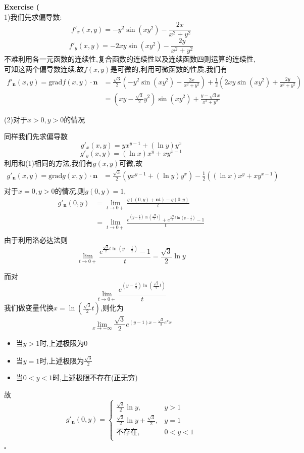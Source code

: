\documentclass{article}
\newenvironment{exercise}[1]{%
{\textbf{Exercise #1} \\ 
    }
}{
  \hfill $\square$ 
  \par\bigskip 
}
\newcommand{\parameter}[1]{\left(#1\right)}
\newcommand{\ve}{\boldsymbol}
\begin{document}
\begin{CJK}{UTF8}{gkai}
\begin{exercise}{2}
    (1)我们先求偏导数:
    \[f'_x(x,y) = -y^2 \sin(xy^2) - \frac{2x}{x^2 + y^2}\]
    \[f'_y(x,y) = - 2xy \sin(xy^2) - \frac{2y}{x^2 + y^2}\]
    不难利用各一元函数的连续性,复合函数的连续性以及连续函数四则运算的连续性,可知这两个偏导数连续,故$f(x,y)$是可微的,利用可微函数的性质,我们有
    \[
    \begin{aligned}
        f'_{\ve{n}}(x,y) = \text{grad}f(x,y) \cdot \ve{n} &= \frac{\sqrt{3}}{2}\parameter{-y^2 \sin(xy^2) - \frac{2x}{x^2 + y^2}} + \frac{1}{2}\parameter{2xy \sin(xy^2) + \frac{2y}{x^2 + y^2}}\\
        &= \parameter{xy - \frac{\sqrt{3}}{2} y^2}\sin(xy^2) + \frac{y - \sqrt{3} x}{x^2 + y^2}
    \end{aligned}    
    \]

    (2)对于$x >0,y > 0$的情况
    
    同样我们先求偏导数
    \[g'_x(x,y) = y x^{y - 1} + (\ln y) y^x\]
    \[g'_y(x,y) = (\ln x) x^y + x y^{x - 1}\]
    利用和(1)相同的方法,我们有$g(x,y)$可微,故
    \[
        \begin{aligned}
            g'_{\ve{n}}(x,y) = \text{grad}g(x,y) \cdot \ve{n} &= \frac{\sqrt{3}}{2}( y x^{y - 1} + (\ln y) y^x) - \frac{1}{2}((\ln x) x^y + x y^{x - 1})\\
        \end{aligned}        
    \]
    对于$x = 0,y > 0$的情况,则$g(0,y) = 1$,
    \[
    \begin{aligned}    
        g'_{\ve{n}}(0,y) &= \lim_{t \to 0+}\frac{g((0,y) + \ve{n}t) - g(0,y) }{t}\\
        &= \lim_{t \to 0+} \frac{e^{(y - \frac{t}{2})\ln (\frac{\sqrt{3}}{2}t)} + e^{\frac{\sqrt{3}}{2}t \ln(y - \frac{t}{2})} - 1}{t}\\
    \end{aligned}    
    \]
    由于利用洛必达法则
    \[\lim_{t \to 0+} \frac{e^{\frac{\sqrt{3}}{2}t \ln(y - \frac{t}{2})} - 1}{t} = \frac{\sqrt{3}}{2}\ln y\]

    而对
    \[\lim_{t \to 0+} \frac{e^{(y - \frac{t}{2})\ln (\frac{\sqrt{3}}{2}t)}}{t}\]
    我们做变量代换$x = \ln\parameter{\frac{\sqrt{3}}{2}t}$,则化为
    \[\lim_{x \to -\infty} \frac{\sqrt{3}}{2} e^{(y - 1)x - \frac{\sqrt{3}}{3} e^x x}\]
    \begin{itemize}
        \item 当$y > 1$时,上述极限为$0$
        \item 当$y = 1$时,上述极限为$\frac{\sqrt{3}}{2}$
        \item 当$0<y < 1$时,上述极限不存在(正无穷)
    \end{itemize}
    故
    \[g'_{\ve{n}}(0,y) = \begin{cases}
        \frac{\sqrt{3}}{2}\ln y ,&y > 1\\
        \frac{\sqrt{3}}{2}\ln y + \frac{\sqrt{3}}{2},& y = 1\\
        \text{不存在},&0 < y < 1\\
    \end{cases}\]


\end{exercise}
\end{CJK}
\end{document}
